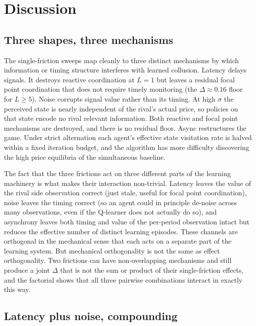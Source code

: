 \section{Discussion}
\label{sec:discussion}

\subsection{Three shapes, three mechanisms}

The single-friction sweeps map cleanly to three distinct mechanisms by which information or timing structure interferes with learned collusion. Latency delays signals. It destroys reactive coordination at $L=1$ but leaves a residual focal point coordination that does not require timely monitoring (the $\Delta\approx 0.16$ floor for $L\geq 5$). Noise corrupts signal value rather than its timing. At high $\sigma$ the perceived state is nearly independent of the rival's actual price, so policies on that state encode no rival relevant information. Both reactive and focal point mechanisms are destroyed, and there is no residual floor. Async restructures the game. Under strict alternation each agent's effective state visitation rate is halved within a fixed iteration budget, and the algorithm has more difficulty discovering the high price equilibria of the simultaneous baseline.

The fact that the three frictions act on three different parts of the learning machinery is what makes their interaction non-trivial. Latency leaves the value of the rival side observation correct (just stale, useful for focal point coordination), noise leaves the timing correct (so an agent could in principle de-noise across many observations, even if the Q-learner does not actually do so), and asynchrony leaves both timing and value of the per-period observation intact but reduces the effective number of distinct learning episodes. These channels are orthogonal in the mechanical sense that each acts on a separate part of the learning system. But mechanical orthogonality is not the same as effect orthogonality. Two frictions can have non-overlapping mechanisms and still produce a joint $\Delta$ that is not the sum or product of their single-friction effects, and the factorial shows that all three pairwise combinations interact in exactly this way.

\subsection{Latency plus noise, compounding}

